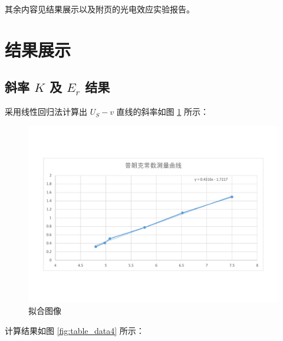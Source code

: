 \documentclass[12pt]{article}
\begin{document}
其余内容见结果展示以及附页的光电效应实验报告。


\section{\normalfont 结果展示}

\subsection{\normalfont 斜率 $K$ 及 $E_r$ 结果}

采用线性回归法计算出 $U_S-v$ 直线的斜率如图 \ref{fig:table_data3} 所示：

\begin{figure}[H] %
    \centering
    \includegraphics[width=\textwidth]{./figures/拟合图像.pdf} 
    \caption{拟合图像}
    \label{fig:table_data3}
\end{figure}

计算结果如图 \ref{fig:table_data4} 所示：
\end{document}
